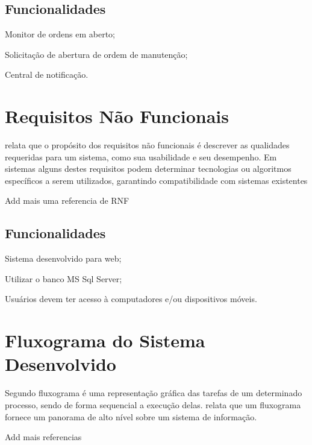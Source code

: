 \subsection{Funcionalidades}
\begin{subalineas}
	\item {Monitor de ordens em aberto};
	\item {Solicitação de abertura de ordem de manutenção};
	\item {Central de notificação}.
\end{subalineas}

\section{Requisitos Não Funcionais}

{\cite{IIBA2005} relata que o propósito dos requisitos não funcionais é descrever as qualidades requeridas para um sistema, como sua usabilidade e seu desempenho. Em sistemas alguns destes requisitos podem determinar tecnologias ou algoritmos específicos a serem utilizados, garantindo compatibilidade com sistemas existentes \cite{cordeiro2007}
	
	{\color{red} Add mais uma referencia de RNF}
	
	\subsection{Funcionalidades}
	\begin{subalineas}
		\item {Sistema desenvolvido para web};
		\item {Utilizar o banco MS Sql Server};
		\item {Usuários devem ter acesso à computadores e/ou dispositivos móveis}.
	\end{subalineas}
	
	
	
	
	\section{Fluxograma do Sistema Desenvolvido}
	
	{Segundo \cite{pejeronimo2002} fluxograma é uma representação gráfica das tarefas de um determinado processo, sendo de forma sequencial a execução delas. \cite{roberthurt} relata que um fluxograma fornece um panorama de alto nível sobre um sistema de informação.
		
		{\color{red} Add mais referencias}
		
}}

